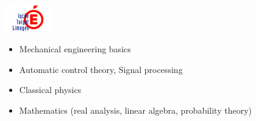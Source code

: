 \begin{cv_content}
\noindent
\begin{minipage}{.15\textwidth}
	\centerline{\includegraphics[width=20mm]{img/turgot}}
\end{minipage}%
\begin{minipage}{.7\textwidth}
	\raggedright
	\begin{itemize}
		\item Mechanical engineering basics
		\item Automatic control theory, Signal processing
		\item Classical physics
		\item Mathematics (real analysis, linear algebra, probability theory)
	\end{itemize}
\end{minipage}

\end{cv_content}

